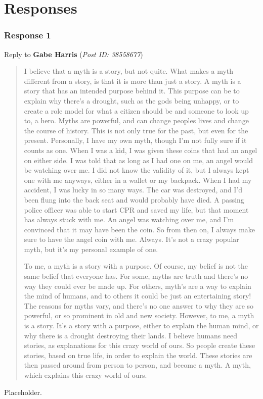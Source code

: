 \documentclass[12pt]{article}
\theoremstyle{definition}
\theoremstyle{plain}
\begin{document}
  \newpage
  \part{Responses}

    \section{Response 1}
      \begin{mdframed}
        Reply to \textbf{Gabe Harris} (\textit{Post ID: 38558677})
      \end{mdframed}
      \begin{quote}
          I believe that a myth is a story, but not quite. What makes a myth different from a
            story, is that it is more than just a story. A myth is a story that has an intended
            purpose behind it. This purpose can be to explain why there’s a drought, such as the
            gods being unhappy, or to create a role model for what a citizen should be and someone
            to look up to, a hero. Myths are powerful, and can change peoples lives and change the
            course of history. This is not only true for the past, but even for the present.
            Personally, I have my own myth, though I’m not fully sure if it counts as one. When I
            was a kid, I was given these coins that had an angel on either side. I was told that as
            long as I had one on me, an angel would be watching over me. I did not know the validity
            of it, but I always kept one with me anyways, either in a wallet or my backpack. When I
            had my accident, I was lucky in so many ways. The car was destroyed, and I’d been flung
            into the back seat and would probably have died. A passing police officer was able to
            start CPR and saved my life, but that moment has always stuck with me. An angel was
            watching over me, and I’m convinced that it may have been the coin. So from then on, I
            always make sure to have the angel coin with me. Always. It’s not a crazy popular myth,
            but it’s my personal example of one.

          To me, a myth is a story with a purpose. Of course, my belief is not the same belief that
            everyone has. For some, myths are truth and there’s no way they could ever be made up.
            For others, myth’s are a way to explain the mind of humans, and to others it could be
            just an entertaining story! The reasons for myths vary, and there’s no one answer to
            why they are so powerful, or so prominent in old and new society. However, to me, a
            myth is a story. It’s a story with a purpose, either to explain the human mind, or why
            there is a drought destroying their lands. I believe humans need stories, as
            explanations for this crazy world of ours. So people create these stories, based on
            true life, in order to explain the world. These stories are then passed around from
            person to person, and become a myth. A myth, which explains this crazy world of ours.
      \end{quote}
      Placeholder.
\end{document}
